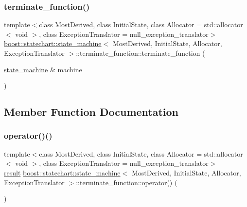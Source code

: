 \subsubsection{\texorpdfstring{terminate\+\_\+function()}{terminate\_function()}}
{\footnotesize\ttfamily template$<$class Most\+Derived, class Initial\+State, class Allocator = std\+::allocator$<$ void $>$, class Exception\+Translator = null\+\_\+exception\+\_\+translator$>$ \\
\mbox{\hyperlink{classboost_1_1statechart_1_1state__machine}{boost\+::statechart\+::state\+\_\+machine}}$<$ Most\+Derived, Initial\+State, Allocator, Exception\+Translator $>$\+::terminate\+\_\+function\+::terminate\+\_\+function (\begin{DoxyParamCaption}\item[{\mbox{\hyperlink{classboost_1_1statechart_1_1state__machine}{state\+\_\+machine}} \&}]{machine }\end{DoxyParamCaption})\hspace{0.3cm}{\ttfamily [inline]}}



\subsection{Member Function Documentation}
\mbox{\label{classboost_1_1statechart_1_1state__machine_1_1terminate__function_acb8264a868bd58d3495d50ac6b363714}} 
\subsubsection{\texorpdfstring{operator()()}{operator()()}}
{\footnotesize\ttfamily template$<$class Most\+Derived, class Initial\+State, class Allocator = std\+::allocator$<$ void $>$, class Exception\+Translator = null\+\_\+exception\+\_\+translator$>$ \\
\mbox{\hyperlink{namespaceboost_1_1statechart_abe807f6598b614d6d87bb951ecd92331}{result}} \mbox{\hyperlink{classboost_1_1statechart_1_1state__machine}{boost\+::statechart\+::state\+\_\+machine}}$<$ Most\+Derived, Initial\+State, Allocator, Exception\+Translator $>$\+::terminate\+\_\+function\+::operator() (\begin{DoxyParamCaption}{ }\end{DoxyParamCaption})\hspace{0.3cm}{\ttfamily [inline]}}

